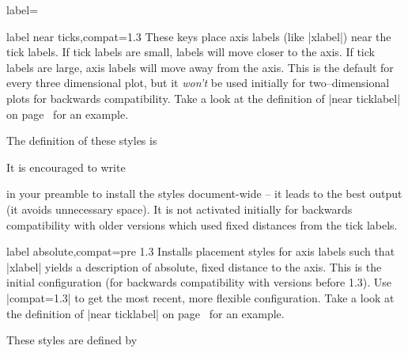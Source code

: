 \begin{pgfplotsxykey}{\x label=}
\begin{pgfplotsxykeylist}{\x label near ticks,compat=1.3}
	These keys place axis labels (like |xlabel|) near the tick labels. If tick labels are small, labels will move closer to the axis. If tick labels are large, axis labels will move away from the axis. This is the default for every three dimensional plot, but it \emph{won't} be used initially for two--dimensional plots for backwards compatibility. Take a look at the definition of |near ticklabel| on page~\pageref{key:near:ticklabel} for an example.

	The definition of these styles is
\begin{codeexample}
\end{codeexample}
	
	It is encouraged to write
\begin{codeexample}
\pgfplotsset{compat=1.3} %
\end{codeexample}
	\noindent in your preamble to install the styles document-wide -- it leads to the best output (it avoids unnecessary space). It is not activated initially for backwards compatibility with older versions which used fixed distances from the tick labels.
\end{pgfplotsxykeylist}

\begin{pgfplotsxykeylist}{\x label absolute,compat=pre 1.3}
	Installs placement styles for axis labels such that |xlabel| yields a description of absolute, fixed distance to the axis. This is the initial configuration (for backwards compatibility with versions before 1.3). Use |compat=1.3| to get the most recent, more flexible configuration. Take a look at the definition of |near ticklabel| on page~\pageref{key:near:ticklabel} for an example.

	These styles are defined by
\begin{codeexample}
\end{codeexample}


\end{pgfplotsxykeylist}
\end{pgfplotsxykey}
